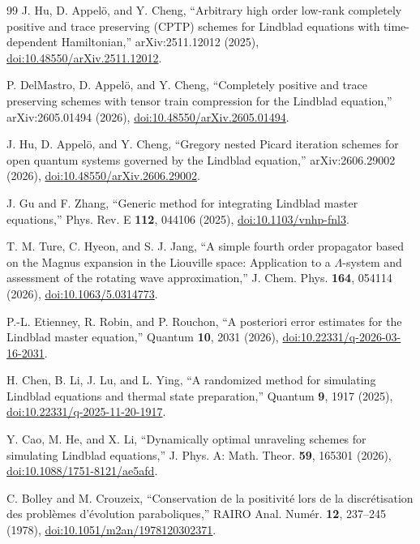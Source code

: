 \begin{thebibliography}{99}
J. Hu, D. Appel\"o, and Y. Cheng, ``Arbitrary high order low-rank completely positive and trace preserving (CPTP) schemes for Lindblad equations with time-dependent Hamiltonian,'' arXiv:2511.12012 (2025), \href{https://doi.org/10.48550/arXiv.2511.12012}{doi:10.48550/arXiv.2511.12012}.

P. DelMastro, D. Appel\"o, and Y. Cheng, ``Completely positive and trace preserving schemes with tensor train compression for the Lindblad equation,'' arXiv:2605.01494 (2026), \href{https://doi.org/10.48550/arXiv.2605.01494}{doi:10.48550/arXiv.2605.01494}.

J. Hu, D. Appel\"o, and Y. Cheng, ``Gregory nested Picard iteration schemes for open quantum systems governed by the Lindblad equation,'' arXiv:2606.29002 (2026), \href{https://doi.org/10.48550/arXiv.2606.29002}{doi:10.48550/arXiv.2606.29002}.

J. Gu and F. Zhang, ``Generic method for integrating Lindblad master equations,'' Phys. Rev. E \textbf{112}, 044106 (2025), \href{https://doi.org/10.1103/vnhp-fnl3}{doi:10.1103/vnhp-fnl3}.

T. M. Ture, C. Hyeon, and S. J. Jang, ``A simple fourth order propagator based on the Magnus expansion in the Liouville space: Application to a $\Lambda$-system and assessment of the rotating wave approximation,'' J. Chem. Phys. \textbf{164}, 054114 (2026), \href{https://doi.org/10.1063/5.0314773}{doi:10.1063/5.0314773}.

P.-L. Etienney, R. Robin, and P. Rouchon, ``A posteriori error estimates for the Lindblad master equation,'' Quantum \textbf{10}, 2031 (2026), \href{https://doi.org/10.22331/q-2026-03-16-2031}{doi:10.22331/q-2026-03-16-2031}.

H. Chen, B. Li, J. Lu, and L. Ying, ``A randomized method for simulating Lindblad equations and thermal state preparation,'' Quantum \textbf{9}, 1917 (2025), \href{https://doi.org/10.22331/q-2025-11-20-1917}{doi:10.22331/q-2025-11-20-1917}.

Y. Cao, M. He, and X. Li, ``Dynamically optimal unraveling schemes for simulating Lindblad equations,'' J. Phys. A: Math. Theor. \textbf{59}, 165301 (2026), \href{https://doi.org/10.1088/1751-8121/ae5afd}{doi:10.1088/1751-8121/ae5afd}.

C. Bolley and M. Crouzeix, ``Conservation de la positivit\'e lors de la discr\'etisation des probl\`emes d'\'evolution paraboliques,'' RAIRO Anal. Num\'er. \textbf{12}, 237--245 (1978), \href{https://doi.org/10.1051/m2an/1978120302371}{doi:10.1051/m2an/1978120302371}.


\end{thebibliography}
